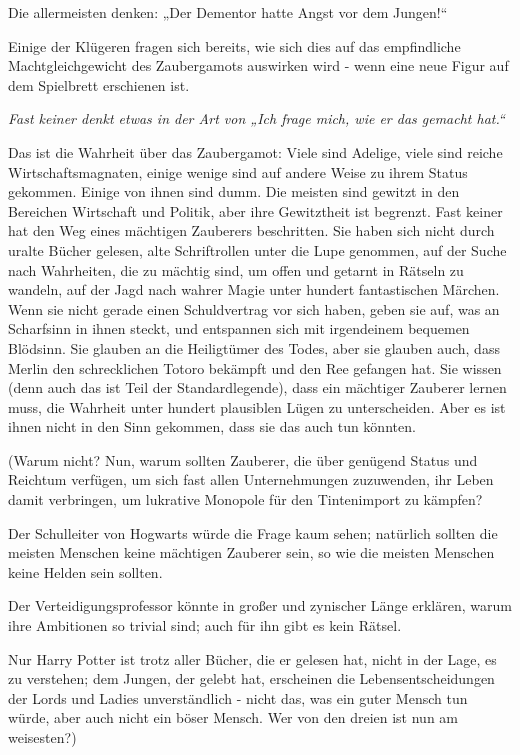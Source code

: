 {Die allermeisten denken: „Der Dementor hatte Angst vor dem Jungen!“

Einige der Klügeren fragen sich bereits, wie sich dies auf das empfindliche Machtgleichgewicht des Zaubergamots auswirken wird - wenn eine neue Figur auf dem Spielbrett erschienen ist.

\emph{Fast keiner denkt etwas in der Art von „Ich frage mich, wie er das gemacht hat.“}

Das ist die Wahrheit über das Zaubergamot: Viele sind Adelige, viele sind reiche Wirtschaftsmagnaten, einige wenige sind auf andere Weise zu ihrem Status gekommen. Einige von ihnen sind dumm. Die meisten sind gewitzt in den Bereichen Wirtschaft und Politik, aber ihre Gewitztheit ist begrenzt. Fast keiner hat den Weg eines mächtigen Zauberers beschritten. Sie haben sich nicht durch uralte Bücher gelesen, alte Schriftrollen unter die Lupe genommen, auf der Suche nach Wahrheiten, die zu mächtig sind, um offen und getarnt in Rätseln zu wandeln, auf der Jagd nach wahrer Magie unter hundert fantastischen Märchen. Wenn sie nicht gerade einen Schuldvertrag vor sich haben, geben sie auf, was an Scharfsinn in ihnen steckt, und entspannen sich mit irgendeinem bequemen Blödsinn. Sie glauben an die Heiligtümer des Todes, aber sie glauben auch, dass Merlin den schrecklichen Totoro bekämpft und den Ree gefangen hat. Sie wissen (denn auch das ist Teil der Standardlegende), dass ein mächtiger Zauberer lernen muss, die Wahrheit unter hundert plausiblen Lügen zu unterscheiden. Aber es ist ihnen nicht in den Sinn gekommen, dass sie das auch tun könnten.

(Warum nicht? Nun, warum sollten Zauberer, die über genügend Status und Reichtum verfügen, um sich fast allen Unternehmungen zuzuwenden, ihr Leben damit verbringen, um lukrative Monopole für den Tintenimport zu kämpfen?

Der Schulleiter von Hogwarts würde die Frage kaum sehen; natürlich sollten die meisten Menschen keine mächtigen Zauberer sein, so wie die meisten Menschen keine Helden sein sollten.

Der Verteidigungsprofessor könnte in großer und zynischer Länge erklären, warum ihre Ambitionen so trivial sind; auch für ihn gibt es kein Rätsel.

Nur Harry Potter ist trotz aller Bücher, die er gelesen hat, nicht in der Lage, es zu verstehen; dem Jungen, der gelebt hat, erscheinen die Lebensentscheidungen der Lords und Ladies unverständlich - nicht das, was ein guter Mensch tun würde, aber auch nicht ein böser Mensch. Wer von den dreien ist nun am weisesten?)

}
